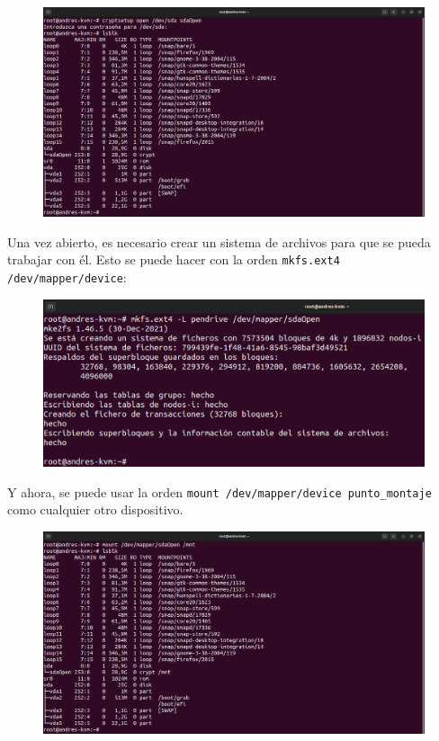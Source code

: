 \documentclass{article}
\begin{document}
\begin{figure}[H]
    \includegraphics[width=\textwidth]{imagenes/Captura desde 2022-10-30 10-54-01.png}
\end{figure}

Una vez abierto, es necesario crear un sistema de archivos para que se pueda trabajar con él. Esto se puede hacer con la orden \verb|mkfs.ext4 /dev/mapper/device|:

\begin{figure}[H]
    \includegraphics[width=\textwidth]{imagenes/Captura desde 2022-10-30 10-57-11.png}
\end{figure}

Y ahora, se puede usar la orden \verb|mount /dev/mapper/device punto_montaje| como cualquier otro dispositivo.

\begin{figure}[H]
    \includegraphics[width=\textwidth]{imagenes/Captura desde 2022-10-30 10-58-23.png}
\end{figure}
\end{document}
